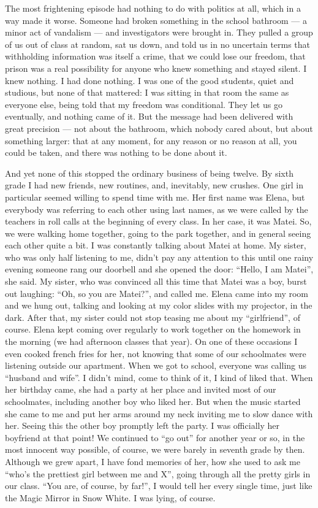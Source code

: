 \documentclass[12pt]{book}
\begin{document}
The most frightening episode had nothing to do with politics at all,
which in a way made it worse. Someone had broken something in the school
bathroom --- a minor act of vandalism --- and investigators were brought
in. They pulled a group of us out of class at random, sat us down, and
told us in no uncertain terms that withholding information was itself a
crime, that we could lose our freedom, that prison was a real
possibility for anyone who knew something and stayed silent. I knew
nothing. I had done nothing. I was one of the good students, quiet and
studious, but none of that mattered: I was sitting in that room the same
as everyone else, being told that my freedom was conditional. They let
us go eventually, and nothing came of it. But the message had been
delivered with great precision --- not about the bathroom, which nobody
cared about, but about something larger: that at any moment, for any
reason or no reason at all, you could be taken, and there was nothing to
be done about it.

And yet none of this stopped the ordinary business of being twelve. By
sixth grade I had new friends, new routines, and, inevitably, new
crushes. One girl in particular seemed willing to spend time with me.
Her first name was Elena, but everybody was referring to each other
using last names, as we were called by the teachers in roll calls at the
beginning of every class. In her case, it was Matei. So, we were walking
home together, going to the park together, and in general seeing each
other quite a bit. I was constantly talking about Matei at home. My
sister, who was only half listening to me, didn't pay any attention to
this until one rainy evening someone rang our doorbell and she opened
the door: ``Hello, I am Matei'', she said. My sister, who was convinced
all this time that Matei was a boy, burst out laughing: ``Oh, so you are
Matei?'', and called me. Elena came into my room and we hung out,
talking and looking at my color slides with my projector, in the dark.
After that, my sister could not stop teasing me about my ``girlfriend'',
of course. Elena kept coming over regularly to work together on the
homework in the morning (we had afternoon classes that year). On one of
these occasions I even cooked french fries for her, not knowing that
some of our schoolmates were listening outside our apartment. When we
got to school, everyone was calling us ``husband and wife''. I didn't
mind, come to think of it, I kind of liked that. When her birthday came,
she had a party at her place and invited most of our schoolmates,
including another boy who liked her. But when the music started she came
to me and put her arms around my neck inviting me to slow dance with
her. Seeing this the other boy promptly left the party. I was officially
her boyfriend at that point! We continued to ``go out'' for another year
or so, in the most innocent way possible, of course, we were barely in
seventh grade by then. Although we grew apart, I have fond memories of
her, how she used to ask me ``who's the prettiest girl between me and
X'', going through all the pretty girls in our class. ``You are, of
course, by far!'', I would tell her every single time, just like the
Magic Mirror in Snow White. I was lying, of course.
\end{document}
